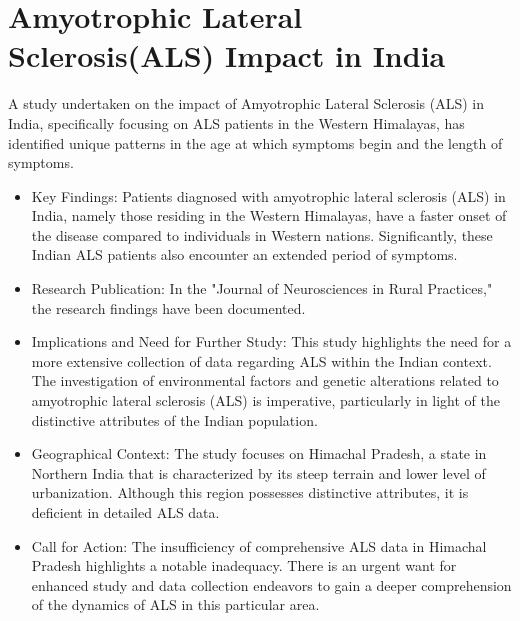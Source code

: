 \documentclass[ 12pt,a4paper,twocolumn,fleqn]{report}
\begin{document}
\section{Amyotrophic Lateral Sclerosis(ALS) Impact in India}
\vspace{2mm}
A study undertaken on the impact of Amyotrophic Lateral Sclerosis (ALS) in India, specifically focusing on ALS patients in the Western Himalayas, has identified unique patterns in the age at which symptoms begin and the length of symptoms.

\begin{itemize}
    \item Key Findings:
Patients diagnosed with amyotrophic lateral sclerosis (ALS) in India, namely those residing in the Western Himalayas, have a faster onset of the disease compared to individuals in Western nations. Significantly, these Indian ALS patients also encounter an extended period of symptoms.

\item Research Publication:
In the "Journal of Neurosciences in Rural Practices," the research findings have been documented.

\item Implications and Need for Further Study:
This study highlights the need for a more extensive collection of data regarding ALS within the Indian context. The investigation of environmental factors and genetic alterations related to amyotrophic lateral sclerosis (ALS) is imperative, particularly in light of the distinctive attributes of the Indian population.

\item Geographical Context:
The study focuses on Himachal Pradesh, a state in Northern India that is characterized by its steep terrain and lower level of urbanization. Although this region possesses distinctive attributes, it is deficient in detailed ALS data.

\item Call for Action:
The insufficiency of comprehensive ALS data in Himachal Pradesh highlights a notable inadequacy. There is an urgent want for enhanced study and data collection endeavors to gain a deeper comprehension of the dynamics of ALS in this particular area.

\end{itemize}

\newpage
  \pagestyle{fancy}
\thisfancypage{%
  \setlength{\fboxsep}{20pt}\doublebox}{}
\normalsize
\end{document}
